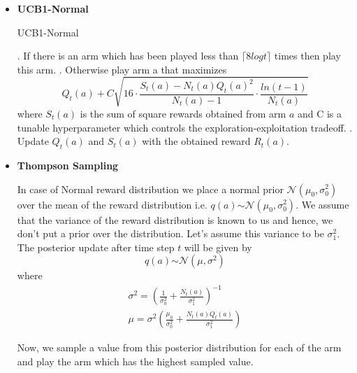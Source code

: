 \documentclass{article}
\begin{document}
	\noindent %
	\begin{itemize}
		
	
	\item \textbf{UCB1-Normal}
	\begin{algorithm}
		\caption{UCB1-Normal}\label{ucb1_normal}
		\begin{algorithmic}
				. If there is an arm which has been played less than $\lceil 8 log t \rceil$ times then play this arm.
				. Otherwise play arm a that maximizes
					\begin{equation}
					\nonumber
						Q_{t}(a) + C\sqrt{16 \cdot \frac{S_{t}(a) - N_{t}(a)Q_{t}(a)^2}{N_{t}(a) - 1} \cdot \frac{ln(t-1)}{N_{t}(a)}}
					\end{equation}
					where $S_{t}(a)$ is the sum of square rewards obtained from arm $a$ and C is a tunable hyperparameter which controls the exploration-exploitation
					tradeoff. 
				. Update $Q_{t}(a)$ and $S_{t}(a)$ with the obtained reward $R_{t}(a)$.
			\EndFor
		\end{algorithmic}
	\end{algorithm}
	
	\break \break
	
	\noindent %
	
	\item \textbf{Thompson Sampling}\par
	
	\noindent %
	In case of Normal reward distribution we place a normal prior $\mathcal{N} (\mu_{0}, \sigma_{0}^{2})$ over the mean of the reward distribution i.e. $q(a) \stackrel{}{\sim} 
	\mathcal{N} (\mu_{0}, \sigma_{0}^{2})$. We assume that the variance of the reward distribution is known to us and hence, we don't put a prior over the 
	distribution. Let's assume this variance to be $\sigma_{1}^{2}$.  The posterior 
	update after time step $t$ will be given by
	\begin{equation}
	\nonumber
		q(a) \stackrel{}{\sim} \mathcal{N} (\mu, \sigma^2)
	\end{equation}
	where
	\begin{equation}
	\nonumber
	\begin{gathered}
		\sigma^2 = \left (\frac{1}{\sigma_{0}^{2}} + \frac{N_{t}(a)}{\sigma_{1}^{2}} \right ) ^{-1}  \\
		\mu = \sigma^{2} \left ( \frac{\mu_{0}}{\sigma_{0}^{2}} + \frac{N_{t}(a)Q_{t}(a)}{\sigma_{1}^{2}} \right )
	\end{gathered}
	\end{equation}
	
	Now, we sample a value from this posterior distribution for each of the arm and play the arm which has the highest sampled value. 
	
	\end{itemize}
\end{document}
